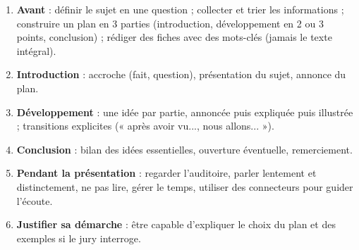 \documentclass[11pt]{article}
\newcommand{\cle}[1]{{\popxbold\color{popdark}#1}}
\begin{document}
\begin{methode}
\begin{enumerate}
\item \textbf{Avant} : définir le sujet en une question ; collecter et trier les informations ; construire un plan en 3 parties (introduction, développement en 2 ou 3 points, conclusion) ; rédiger des \cle{fiches} avec des mots-clés (jamais le texte intégral).
\item \textbf{Introduction} : accroche (fait, question), présentation du sujet, annonce du plan.
\item \textbf{Développement} : une idée par partie, annoncée puis expliquée puis illustrée ; transitions explicites (« après avoir vu..., nous allons... »).
\item \textbf{Conclusion} : bilan des idées essentielles, ouverture éventuelle, remerciement.
\item \textbf{Pendant la présentation} : regarder l'auditoire, parler lentement et distinctement, ne pas lire, gérer le temps, utiliser des connecteurs pour guider l'écoute.
\item \textbf{Justifier sa démarche} : être capable d'expliquer le choix du plan et des exemples si le jury interroge.
\end{enumerate}
\end{methode}
\end{document}
